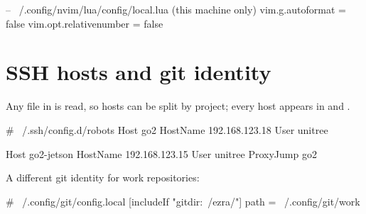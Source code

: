 \begin{plain}
-- ~/.config/nvim/lua/config/local.lua  (this machine only)
vim.g.autoformat = false
vim.opt.relativenumber = false
\end{plain}

\section{SSH hosts and git identity}

Any file in  is read, so hosts can be split by project; every host appears
in  and .

\begin{plain}
# ~/.ssh/config.d/robots
Host go2
  HostName 192.168.123.18
  User unitree

Host go2-jetson
  HostName 192.168.123.15
  User unitree
  ProxyJump go2
\end{plain}

A different git identity for work repositories:

\begin{plain}
# ~/.config/git/config.local
[includeIf "gitdir:~/ezra/"]
    path = ~/.config/git/work
\end{plain}
